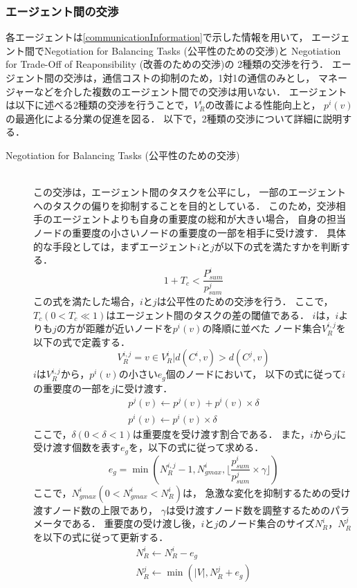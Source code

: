\documentclass[12pt,a4j,twoside]{jarticle}
\begin{document}
  \subsubsection{エージェント間の交渉}
  各エージェントは\ref{communicationInformation}で示した情報を用いて，
  エージェント間でNegotiation for Balancing Tasks (公平性のための交渉)と
  Negotiation for Trade-Off of Reaponsibility (改善のための交渉)の
  2種類の交渉を行う．
  エージェント間の交渉は，通信コストの抑制のため，1対1の通信のみとし，
  マネージャーなどを介した複数のエージェント間での交渉は用いない．
  エージェントは以下に述べる2種類の交渉を行うことで，$V^i_R$の改善による性能向上と，
  $p^i(v)$の最適化による分業の促進を図る．
  以下で，2種類の交渉について詳細に説明する．
  \begin{description}
    \item[Negotiation for Balancing Tasks (公平性のための交渉)]\mbox{}\\
      この交渉は，エージェント間のタスクを公平にし，
      一部のエージェントへのタスクの偏りを抑制することを目的としている．
      このため，交渉相手のエージェントよりも自身の重要度の総和が大きい場合，
      自身の担当ノードの重要度の小さいノードの重要度の一部を相手に受け渡す．
      具体的な手段としては，まずエージェント$i$と$j$が以下の式を満たすかを判断する．
      \begin{equation}
        1 + T_c < \dfrac{P^i_{sum}}{p^j_{sum}}
      \end{equation}
      この式を満たした場合，$i$と$j$は公平性のための交渉を行う．
      ここで，$T_c(0 < T_c \ll 1)$はエージェント間のタスクの差の閾値である．
      $i$は，$i$よりも$j$の方が距離が近いノードを$p^i(v)$の降順に並べた
      ノード集合$V^{i, j}_R$を以下の式で定義する．
      \begin{equation}
        V^{i, j}_R = {v \in V^i_R|d(C^i, v) > d(C^j, v)}  
      \end{equation}
      $i$は$V^{i, j}_R$から，$p^i(v)$の小さい$e_g$個のノードにおいて，
      以下の式に従って$i$の重要度の一部を$j$に受け渡す．
      \begin{eqnarray}
        p^j(v) \gets p^j(v) + p^i(v) \times \delta \\
        p^i(v) \gets p^i(v) \times \delta
      \end{eqnarray}
      ここで，$\delta(0 < \delta < 1)$は重要度を受け渡す割合である．
      また，$i$から$j$に受け渡す個数を表す$e_g$を，以下の式に従って求める．
      \begin{equation}
        e_g = \min(N^{i, j}_R - 1, N^i_{gmax}, \lfloor \dfrac{p^i_{sum}}{p^j_{sum}} \times \gamma \rfloor)
      \end{equation}
      ここで，$N^i_{gmax}(0 < N^i_{gmax} < N^i_R)$は，
      急激な変化を抑制するための受け渡すノード数の上限であり，
      $\gamma$は受け渡すノード数を調整するためのパラメータである．
      重要度の受け渡し後，$i$と$j$のノード集合のサイズ$N^i_R$，$N^j_R$を以下の式に従って更新する．
      \begin{eqnarray}
        N^i_R \gets N^i_R - e_g \\
        N^j_R \gets \min(|V|, N^j_R+e_g)
      \end{eqnarray}


\end{description}
\end{document}
